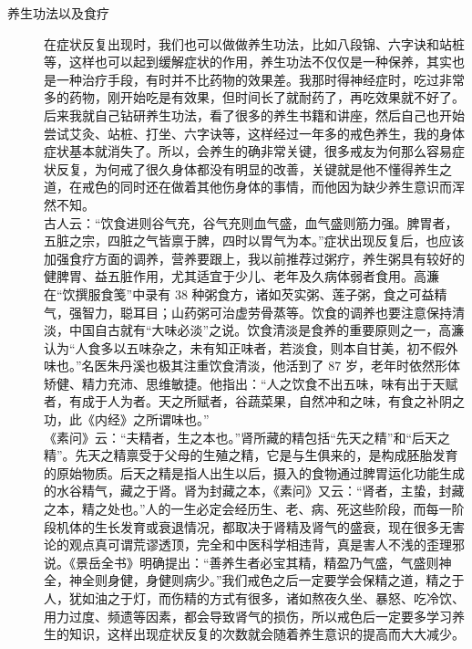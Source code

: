 \documentclass{ctexart}
\begin{document}
\begin{description}
    \item[养生功法以及食疗] 在症状反复出现时，我们也可以做做养生功法，比如八段锦、六字诀和站桩等，这样也可以起到缓解症状的作用，养生功法不仅仅是一种保养，其实也是一种治疗手段，有时并不比药物的效果差。我那时得神经症时，吃过非常多的药物，刚开始吃是有效果，但时间长了就耐药了，再吃效果就不好了。后来我就自己钻研养生功法，看了很多的养生书籍和讲座，然后自己也开始尝试艾灸、站桩、打坐、六字诀等，这样经过一年多的戒色养生，我的身体症状基本就消失了。所以，会养生的确非常关键，很多戒友为何那么容易症状反复，为何戒了很久身体都没有明显的改善，关键就是他不懂得养生之道，在戒色的同时还在做着其他伤身体的事情，而他因为缺少养生意识而浑然不知。\\ 古人云：“饮食进则谷气充，谷气充则血气盛，血气盛则筋力强。脾胃者，五脏之宗，四脏之气皆禀于脾，四时以胃气为本。”症状出现反复后，也应该加强食疗方面的调养，营养要跟上，我以前推荐过粥疗，养生粥具有较好的健脾胃、益五脏作用，尤其适宜于少儿、老年及久病体弱者食用。高濂在“饮撰服食笺”中录有 38 种粥食方，诸如芡实粥、莲子粥，食之可益精气，强智力，聪耳目；山药粥可治虚劳骨蒸等。饮食的调养也要注意保持清淡，中国自古就有“大味必淡”之说。饮食清淡是食养的重要原则之一，高濂认为“人食多以五味杂之，未有知正味者，若淡食，则本自甘美，初不假外味也。”名医朱丹溪也极其注重饮食清淡，他活到了 87 岁，老年时依然形体矫健、精力充沛、思维敏捷。他指出：“人之饮食不出五味，味有出于天赋者，有成于人为者。天之所赋者，谷蔬菜果，自然冲和之味，有食之补阴之功，此《内经》之所谓味也。”\\ 《素问》云：“夫精者，生之本也。”肾所藏的精包括“先天之精”和“后天之精”。先天之精禀受于父母的生殖之精，它是与生俱来的，是构成胚胎发育的原始物质。后天之精是指人出生以后，摄入的食物通过脾胃运化功能生成的水谷精气，藏之于肾。肾为封藏之本，《素问》又云：“肾者，主蛰，封藏之本，精之处也。”人的一生必定会经历生、老、病、死这些阶段，而每一阶段机体的生长发育或衰退情况，都取决于肾精及肾气的盛衰，现在很多无害论的观点真可谓荒谬透顶，完全和中医科学相违背，真是害人不浅的歪理邪说。《景岳全书》明确提出：“善养生者必宝其精，精盈乃气盛，气盛则神全，神全则身健，身健则病少。”我们戒色之后一定要学会保精之道，精之于人，犹如油之于灯，而伤精的方式有很多，诸如熬夜久坐、暴怒、吃冷饮、用力过度、频遗等因素，都会导致肾气的损伤，所以戒色后一定要多学习养生的知识，这样出现症状反复的次数就会随着养生意识的提高而大大减少。

\end{description}
\end{document}

